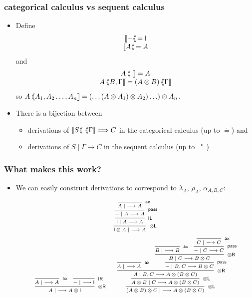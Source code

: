 \documentclass[10pt,t]{beamer}
\newcommand{\I}{\mathsf{I}}
\newcommand{\ot}{\otimes}
\newcommand{\al}{\alpha}
\newcommand{\lam}{\lambda}
\newcommand{\n}{{-}}
\newcommand{\tto}{\Longrightarrow}
\newcommand{\ax}{\mathsf{ax}}
\newcommand{\uf}{\mathsf{pass}}
\newcommand{\IL}{\I\mathsf{L}}
\newcommand{\otL}{\ot\mathsf{L}}
\newcommand{\IR}{\I\mathsf{R}}
\newcommand{\otR}{\ot\mathsf{R}}
\renewcommand{\vdash}{\longrightarrow}
\newcommand{\lb}{\langle\hspace*{-0.9mm}\langle}
\newcommand{\csem}[2]{#1\, \lb #2 \rrbracket}
\newcommand{\ssem}[1]{\llbracket #1 \lb\, }
\begin{document}

\begin{frame}

\frametitle{categorical calculus vs sequent calculus}

\begin{itemize}

\item Define
\[
\begin{array}{c}
\ssem{\n} = \I \\ 
\ssem{A} = A
\end{array}
\]
and
\[
\begin{array}{c}
\csem{A}{~} = A \\
\csem{A}{B, \Gamma} = \csem{(A \otimes B)}{\Gamma}  
\end{array}
\]
so $\csem{A}{A_1, A_2 \ldots, A_n} = (\ldots (A \otimes A_1)
  \otimes A_2) \ldots) \otimes A_n$.

\bigskip

\item There is a bijection between
\begin{itemize}
\item derivations of
  $\csem{\ssem{S}}{\Gamma} \tto C$ in the categorical calculus (up to
  $\doteq$) and
\item derivations of  $S \mid \Gamma \vdash C$
  in the sequent calculus (up to $\circeq$) 
\end{itemize}

\end{itemize}

\end{frame}


\begin{frame}

\frametitle{What makes this work?}

\begin{itemize}

\item We can easily construct derivations to correspond to $\lam_A$,
  $\rho_A$, $\al_{A,B,C}$:

\[
\scriptsize
\infer[\otL]{\I \ot A \mid ~ \vdash A}{
  \infer[\IL]{\I \mid A \vdash A}{
    \infer[\uf]{\n \mid A \vdash A}{
      \infer[\ax]{A \mid ~ \vdash A}{
      }
    }
  }
}
\]
\[
\scriptsize
\infer[\otR]{A \mid ~ \vdash A \ot \I}{
  \infer[\ax]{A \mid ~ \vdash A}{
  }
  &
  \infer[\IR]{\n \mid ~ \vdash \I}{
  }
}
\qquad
\infer[\otL]{(A \ot B) \ot C \mid ~ \vdash A \ot (B \ot C)}{
  \infer[\otL]{A \ot B \mid C \vdash A \ot (B \ot C)}{
    \infer[\otR]{A \mid B, C \vdash A \ot (B \ot C)}{
      \infer[\ax]{A \mid ~ \vdash A}{
      }
      &
      \infer[\uf]{\n \mid B, C \vdash B \ot C}{
        \infer[\otR]{B \mid C \vdash B \ot C}{
          \infer[\ax]{B \mid ~ \vdash B}{
          }
          &
          \infer[\uf]{\n \mid C \vdash C}{
            \infer[\ax]{C \mid ~ \vdash C}{
            }
          }
        }
      }
    }
  }
}
\]


\end{itemize}

\end{frame}
\end{document}
